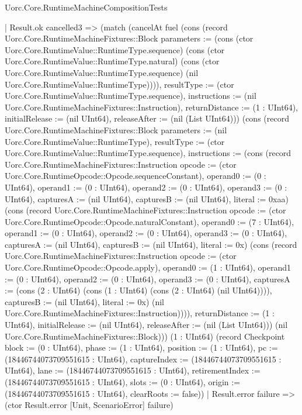 \begin{lexlean}{Uorc.Core.RuntimeMachineCompositionTests}
\begin{semanticmodule}
{          | Result.ok cancelled3 => (match (cancelAt fuel (cons (record Uorc.Core.RuntimeMachineFixtures::Block {parameters := (cons (ctor Uorc.Core.RuntimeValue::RuntimeType.sequence) (cons (ctor Uorc.Core.RuntimeValue::RuntimeType.natural) (cons (ctor Uorc.Core.RuntimeValue::RuntimeType.sequence) (nil Uorc.Core.RuntimeValue::RuntimeType)))), resultType := (ctor Uorc.Core.RuntimeValue::RuntimeType.sequence), instructions := (nil Uorc.Core.RuntimeMachineFixtures::Instruction), returnDistance := (1 : UInt64), initialRelease := (nil UInt64), releaseAfter := (nil (List UInt64))}) (cons (record Uorc.Core.RuntimeMachineFixtures::Block {parameters := (nil Uorc.Core.RuntimeValue::RuntimeType), resultType := (ctor Uorc.Core.RuntimeValue::RuntimeType.sequence), instructions := (cons (record Uorc.Core.RuntimeMachineFixtures::Instruction {opcode := (ctor Uorc.Core.RuntimeOpcode::Opcode.sequenceConstant), operand0 := (0 : UInt64), operand1 := (0 : UInt64), operand2 := (0 : UInt64), operand3 := (0 : UInt64), capturesA := (nil UInt64), capturesB := (nil UInt64), literal := 0xaa}) (cons (record Uorc.Core.RuntimeMachineFixtures::Instruction {opcode := (ctor Uorc.Core.RuntimeOpcode::Opcode.naturalConstant), operand0 := (7 : UInt64), operand1 := (0 : UInt64), operand2 := (0 : UInt64), operand3 := (0 : UInt64), capturesA := (nil UInt64), capturesB := (nil UInt64), literal := 0x}) (cons (record Uorc.Core.RuntimeMachineFixtures::Instruction {opcode := (ctor Uorc.Core.RuntimeOpcode::Opcode.apply), operand0 := (1 : UInt64), operand1 := (0 : UInt64), operand2 := (0 : UInt64), operand3 := (0 : UInt64), capturesA := (cons (2 : UInt64) (cons (1 : UInt64) (cons (2 : UInt64) (nil UInt64)))), capturesB := (nil UInt64), literal := 0x}) (nil Uorc.Core.RuntimeMachineFixtures::Instruction)))), returnDistance := (1 : UInt64), initialRelease := (nil UInt64), releaseAfter := (nil (List UInt64))}) (nil Uorc.Core.RuntimeMachineFixtures::Block))) (1 : UInt64) (record Checkpoint {block := (0 : UInt64), phase := (1 : UInt64), position := (1 : UInt64), pc := (18446744073709551615 : UInt64), captureIndex := (18446744073709551615 : UInt64), lane := (18446744073709551615 : UInt64), retirementIndex := (18446744073709551615 : UInt64), slots := (0 : UInt64), origin := (18446744073709551615 : UInt64), clearRoots := false}))
            | Result.error failure => (ctor Result.error [Unit, ScenarioError] failure)
}
\end{semanticmodule}
\end{lexlean}
